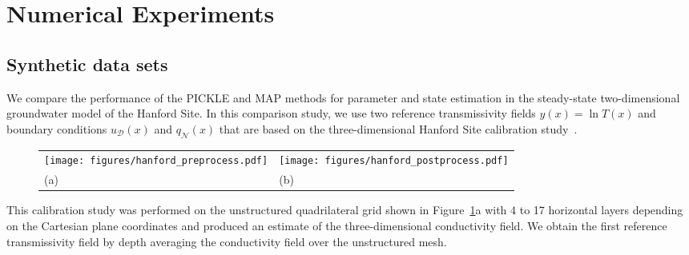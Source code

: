 \documentclass{agujournal2019}
\renewcommand{\caption}[2][]{\ignorespaces}
\begin{document}
\section{Numerical Experiments}
\label{sec:experiments}

\subsection{Synthetic data sets}

We compare the performance of the PICKLE and MAP methods for parameter and state estimation in the steady-state two-dimensional groundwater model of the Hanford Site. In this comparison study, we use two
reference transmissivity fields $y(x)=\ln T(x)$ and boundary conditions $u_\mathcal{D}(x)$ and $q_\mathcal{N}(x)$ that are based on the three-dimensional Hanford Site calibration study~\citep{cole2001transient}.
%
\begin{figure}
    \centering%
    \begin{tabu} to 0.97
        \texttt{[image: figures/hanford\_preprocess.pdf]}
    &
        \texttt{[image: figures/hanford\_postprocess.pdf]}\\
    (a) & (b)
    \end{tabu}
    \caption{\subref{fig:hanford_preprocess} Mesh of the Hanford site subsurface flow model in the calibration study of \cite{cole2001transient}. Cells that represent Columbia River are highlighted in blue with the river head boundary conditions prescribed at the vertices of these cells. \subref{fig:hanford_postprocess} A quasi-uniform coarse mesh with the $N_{FV}=1475$ cells used in this study.}
    \label{fig:hanford_geometry}
\end{figure}
\begin{comment}
\begin{figure}
    \centering
    \texttt{[image: pickle-hanford-paper/figures/Fig\_Hanford.pdf]}
    \caption{(a) Mesh of the Hanford Site subsurface flow model in the calibration study of \cite{cole2001transient}. Cells that represent the Columbia River are highlighted in blue with the river head boundary conditions prescribed at the vertices of these cells. (b) A quasi-uniform coarse mesh with the $N_{FV}=1475$ cells used in this study.}
    \label{fig:hanford_geometry}
\end{figure}
\end{comment}
%
This calibration study was performed on the unstructured quadrilateral grid shown in Figure~\ref{fig:hanford_geometry}a with 4 to 17 horizontal layers depending on the Cartesian plane coordinates and produced an estimate of the three-dimensional conductivity field. 
We obtain the first reference transmissivity field by depth averaging the conductivity field over the unstructured mesh.  
\end{document}
